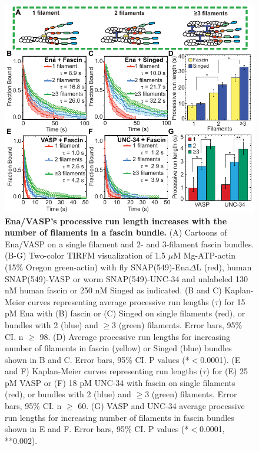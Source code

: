 \begin{figure}
\centering
\includegraphics[width=\textwidth]{img/ch02/Figure_2_elife.pdf}
\caption[Ena/VASP's processive run length increases with the number of filaments in a fascin bundle.]{\textbf{Ena/VASP's processive run length increases with the number of filaments in a fascin bundle.} (A) Cartoons of Ena/VASP on a single filament and 2- and 3-filament fascin bundles. (B-G) Two-color TIRFM visualization of 1.5 $\mu$M Mg-ATP-actin (15\% Oregon green-actin) with fly SNAP(549)-Ena$\Delta$L (red), human SNAP(549)-VASP or worm SNAP(549)-UNC-34 and unlabeled 130 nM human fascin or 250 nM Singed as indicated. (B and C) Kaplan-Meier curves representing average processive run lengths ($\tau$) for 15 pM Ena with (B) fascin or (C) Singed on single filaments (red), or bundles with 2 (blue) and $\geq$3 (green)  filaments. Error bars, 95\% CI. n $\geq$ 98. (D) Average processive run lengths for increasing number of filaments in fascin (yellow) or Singed (blue) bundles shown in B and C. Error bars, 95\% CI. P values (*$<$0.0001). (E and F) Kaplan-Meier curves representing run lengths ($\tau$) for (E) 25 pM VASP or (F) 18 pM UNC-34 with fascin on single filaments (red), or bundles with 2 (blue) and $\geq$3 (green) filaments. Error bars, 95\% CI. n $\geq$ 60. (G) VASP and UNC-34 average processive run lengths for increasing number of filaments in fascin bundles shown in E and F. Error bars, 95\% CI. P values (*$<$0.0001, **0.002).}
\label{fig:ena-filaments}
\end{figure}


